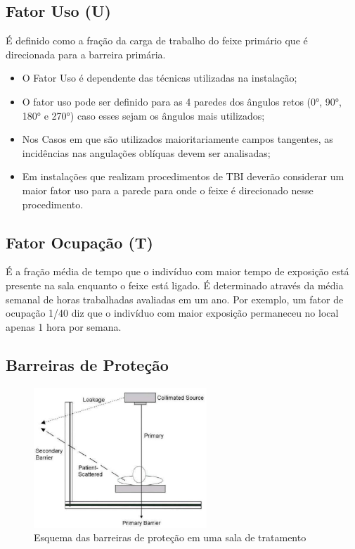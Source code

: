 \documentclass[11pt,a4paper]{article}
\begin{document}
        \subsection*{\textcolor{CarnationPink}{Fator Uso (U)}}

            É definido como a fração da carga de trabalho do feixe primário que é direcionada para a barreira primária.

            \begin{itemize}
                \item O Fator Uso é dependente das técnicas utilizadas na instalação;
                \item O fator uso pode ser definido para as 4 paredes dos ângulos retos (0°, 90°, 180° e 270°) caso esses sejam os ângulos mais utilizados;
                \item Nos Casos em que são utilizados maioritariamente campos tangentes, as incidências nas angulações oblíquas devem ser analisadas;
                \item Em instalações que realizam procedimentos de TBI deverão considerar um maior fator uso para a parede para onde o feixe é direcionado nesse procedimento.
            \end{itemize}


        \subsection*{\textcolor{CarnationPink}{Fator Ocupação (T)}}

            É a fração média de tempo que o indivíduo com maior tempo de exposição está presente na sala enquanto o feixe está ligado. É determinado através da média semanal de horas trabalhadas avaliadas em um ano. Por exemplo, um fator de ocupação 1/40 diz que o indivíduo com maior exposição permaneceu no local apenas 1 hora por semana.
        
        \subsection{Barreiras de Proteção}

            \begin{figure}
                \centering
                \includegraphics[width=0.58\textwidth]{Imagens/esquemaBarreirasDeProtecao.JPG}
                \caption{Esquema das barreiras de proteção em uma sala de tratamento}
                \label{fig:esquemaBarreirasDeProtecao}
            \end{figure}
\end{document}
